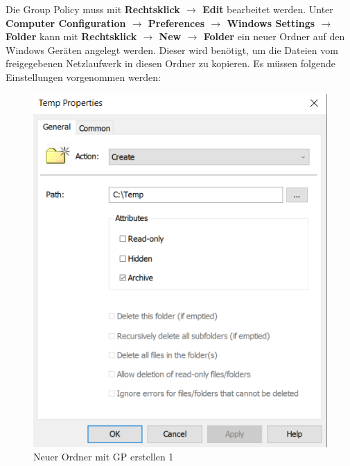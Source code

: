 Die Group Policy muss mit \textbf{Rechtsklick $\rightarrow$ Edit} bearbeitet werden.
Unter \textbf{Computer Configuration $\rightarrow$ Preferences $\rightarrow$ Windows Settings $\rightarrow$ Folder} kann mit \textbf{Rechtsklick $\rightarrow$ New $\rightarrow$ Folder} ein neuer Ordner auf den Windows Geräten angelegt werden.
Dieser wird benötigt, um die Dateien vom freigegebenen Netzlaufwerk in diesen Ordner zu kopieren.
Es müssen folgende Einstellungen vorgenommen werden:\\
\begin{minipage}{0.5\linewidth}
    \begin{figure}[H]
        \centering
        \includegraphics[width=0.7\linewidth]{../img/sysmon/new-folder-1.png}
        \caption{Neuer Ordner mit GP erstellen 1}
    \end{figure}
\end{minipage}
